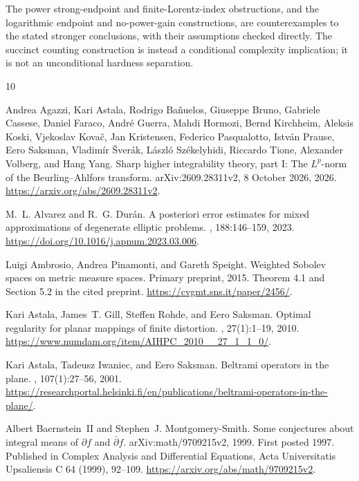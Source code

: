 \documentclass[11pt,a4paper]{article}
\numberwithin{equation}{section}
\theoremstyle{definition}
\theoremstyle{remark}\newtheorem{remark}[theorem]{Remark}
\begin{document}
The power strong-endpoint and finite-Lorentz-index obstructions,
and the logarithmic endpoint and no-power-gain constructions, are counterexamples
to the stated stronger conclusions, with their assumptions checked
directly. The succinct counting construction is instead a conditional
complexity implication; it is not an unconditional hardness separation.



\begin{thebibliography}{10}

Andrea Agazzi, Kari Astala, Rodrigo Ba{\~n}uelos, Giuseppe Bruno, Gabriele
  Cassese, Daniel Faraco, Andr{\'e} Guerra, Mahdi Hormozi, Bernd Kirchheim,
  Aleksis Koski, Vjekoslav Kova{\v c}, Jan Kristensen, Federico Pasqualotto,
  Istv{\'a}n Prause, Eero Saksman, Vladim{\'i}r {\v S}ver{\'a}k, L{\'a}szl{\'o}
  Sz{\'e}kelyhidi, Riccardo Tione, Alexander Volberg, and Hang Yang.
\newblock Sharp higher integrability theory, part {I}: The {$L^p$}-norm of the
  {Beurling--Ahlfors} transform.
\newblock arXiv:2609.28311v2, 8 October 2026, 2026.
\newblock \url{https://arxiv.org/abs/2609.28311v2}.

M.~L. Alvarez and R.~G. Dur{\'a}n.
\newblock A posteriori error estimates for mixed approximations of degenerate
  elliptic problems.
, 188:146--159, 2023.
\newblock \url{https://doi.org/10.1016/j.apnum.2023.03.006}.

Luigi Ambrosio, Andrea Pinamonti, and Gareth Speight.
\newblock Weighted {Sobolev} spaces on metric measure spaces.
\newblock Primary preprint, 2015.
\newblock Theorem 4.1 and Section 5.2 in the cited preprint.
  \url{https://cvgmt.sns.it/paper/2456/}.

Kari Astala, James~T. Gill, Steffen Rohde, and Eero Saksman.
\newblock Optimal regularity for planar mappings of finite distortion.
, 27(1):1--19, 2010.
\newblock \url{https://www.numdam.org/item/AIHPC_2010__27_1_1_0/}.

Kari Astala, Tadeusz Iwaniec, and Eero Saksman.
\newblock Beltrami operators in the plane.
, 107(1):27--56, 2001.
\newblock
  \url{https://researchportal.helsinki.fi/en/publications/beltrami-operators-in-the-plane/}.

Albert Baernstein~II and Stephen~J. Montgomery-Smith.
\newblock Some conjectures about integral means of {$\partial f$} and
  {$\bar\partial f$}.
\newblock arXiv:math/9709215v2, 1999.
\newblock First posted 1997. Published in Complex Analysis and Differential
  Equations, Acta Universitatis Upsaliensis C 64 (1999), 92--109.
  \url{https://arxiv.org/abs/math/9709215v2}.


\end{thebibliography}
\end{document}
